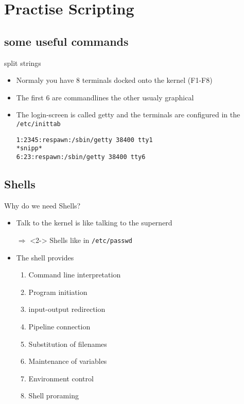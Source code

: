 \documentclass[handout]{beamer}
\newcommand{\code}[1]{\colorbox{lGray}{\texttt{#1}}}
\begin{document}
\section{Practise Scripting} 
 	\subsection{some useful commands}
		\begin{frame}[fragile]{split strings}
			\begin{itemize}
                \item<1-> Normaly you have 8 terminals docked onto the kernel (F1-F8)
                \item<2-> The first 6 are commandlines the other usualy graphical
                \item<3-> The login-screen is called getty and the terminals are configured in the \code{/etc/inittab}
                \begin{verbatim}
1:2345:respawn:/sbin/getty 38400 tty1
*snipp*
6:23:respawn:/sbin/getty 38400 tty6
\end{verbatim}
            \end{itemize}
		\end{frame}
    \subsection{Shells}
        \begin{frame}{Why do we need Shells?}
            \begin{itemize}
                \item<1-> Talk to the kernel is like talking to the supernerd
                \item[$\Rightarrow$]<2-> Shells like in \code{/etc/passwd}
                \item<2-> The shell provides
                \begin{enumerate}
                    \item<3-> Command line interpretation
                    \item<4-> Program initiation
                    \item<5-> input-output redirection
                    \item<6-> Pipeline connection
                    \item<7-> Substitution of filenames
                    \item<8-> Maintenance of variables
                    \item<9-> Environment control
                    \item<10-> Shell proraming
                \end{enumerate}
            \end{itemize}
        \end{frame}
    
\end{document}
